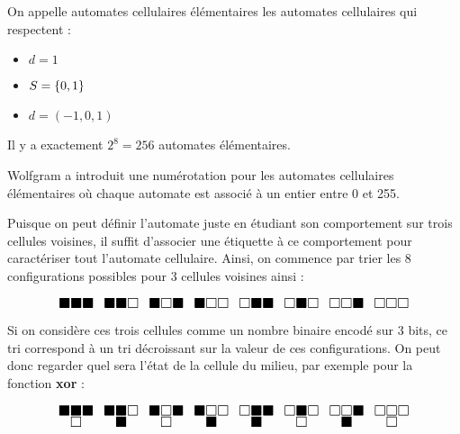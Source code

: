 \begin{definition}
	On appelle automates cellulaires élémentaires les automates cellulaires qui respectent :
	\begin{itemize}
		\item $d = 1$
		\item $S = \left\{0,1\right\}$
		\item $d = (-1,0,1)$
	\end{itemize}

	Il y a exactement $2^8 = 256$ automates élémentaires.
\end{definition}

\begin{notation}
	Wolfgram a introduit une numérotation \cite{wolfgramClass} pour les automates cellulaires élémentaires où chaque automate
	est associé à un entier entre 0 et 255.

	Puisque on peut définir l'automate juste en étudiant son comportement sur trois cellules voisines, il suffit d'associer une
	étiquette à ce comportement pour caractériser tout l'automate cellulaire. Ainsi, on commence par trier
	les 8 configurations possibles pour 3 cellules voisines ainsi :

	\[ \LARGE
		\substack{\blacksquare \blacksquare \blacksquare } \enspace
		\substack{\blacksquare \blacksquare \square } \enspace
		\substack{\blacksquare \square \blacksquare } \enspace
		\substack{\blacksquare \square \square } \enspace
		\substack{\square \blacksquare \blacksquare } \enspace
		\substack{\square \blacksquare \square } \enspace
		\substack{\square \square \blacksquare } \enspace
		\substack{\square \square \square }
	\]

	Si on considère ces trois cellules comme un nombre binaire encodé sur 3 bits, ce tri correspond à un tri décroissant sur la
	valeur de ces configurations. On peut donc regarder quel sera l'état de la cellule du milieu, par exemple pour la
	fonction \textbf{xor} :


	\[ \LARGE
		\substack{\blacksquare \blacksquare \blacksquare \\ \square } \enspace
		\substack{\blacksquare \blacksquare \square \\ \blacksquare} \enspace
		\substack{\blacksquare \square \blacksquare \\ \square} \enspace
		\substack{\blacksquare \square \square \\ \blacksquare} \enspace
		\substack{\square \blacksquare \blacksquare \\ \blacksquare} \enspace
		\substack{\square \blacksquare \square \\ \square} \enspace
		\substack{\square \square \blacksquare \\ \blacksquare} \enspace
		\substack{\square \square \square \\ \square}
	\]


\end{notation}
